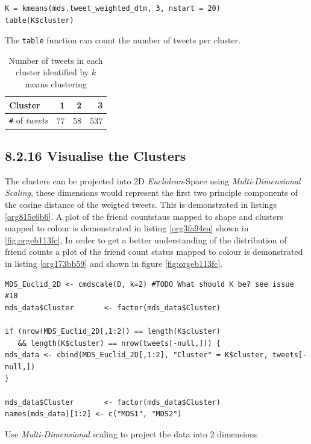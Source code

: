 \documentclass[11pt]{article}
\begin{document}
\begin{listing}[htbp]
\begin{verbatim}
K = kmeans(mds.tweet_weighted_dtm, 3, nstart = 20)
table(K$cluster)
\end{verbatim}
\caption{\label{org4ef10d1}The \texttt{table} function can count the number of tweets per cluster.}
\end{listing}

\begin{table}[htbp]
\caption{\label{tab:org3d6d650}Number of tweets in each cluster identified by \(k\) means clustering}
\centering
\begin{tabular}{lrrr}
Cluster & 1 & 2 & 3\\
\hline
\texttt{\#} of \emph{tweets} & 77 & 58 & 537\\
\end{tabular}
\end{table}

\subsection{8.2.16 Visualise the Clusters}
\label{sec:org2afa911}
The clusters can be projected into 2D \emph{Euclidean}-Space using \emph{Multi-Dimensional
Scaling}, these dimensions would represent the first two principle components of
the cosine distance of the weigted tweets. This is demonstrated in listings
\ref{org815c6b6}. A plot of the friend countstaus mapped to shape and clusters mapped to
colour is demonstrated in listing \ref{org3fa94ea} shown in \ref{fig:orgeb113fc}, In order to get a better
understanding of the distribution of friend counts a plot of the friend count
status mapped to colour is demonstrated in listing \ref{org173bb59} and shown in figure \ref{fig:orgeb113fc}.


\begin{listing}[htbp]
\begin{verbatim}
MDS_Euclid_2D <- cmdscale(D, k=2) #TODO What should K be? see issue #10
mds_data$Cluster       <- factor(mds_data$Cluster)

if (nrow(MDS_Euclid_2D[,1:2]) == length(K$cluster)
   && length(K$cluster) == nrow(tweets[-null,])) {
mds_data <- cbind(MDS_Euclid_2D[,1:2], "Cluster" = K$cluster, tweets[-null,])
}

mds_data$Cluster       <- factor(mds_data$Cluster)
names(mds_data)[1:2] <- c("MDS1", "MDS2")
\end{verbatim}
\caption{\label{org815c6b6}Use \emph{Multi-Dimensional} scaling to project the data into 2 dimensions}
\end{listing}
\end{document}
